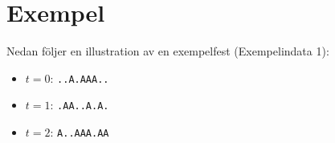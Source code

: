 \section*{Exempel}
Nedan följer en illustration av en exempelfest (Exempelindata 1):

\begin{itemize}
\item $t=0$: \texttt{..A.AAA..}
\item $t=1$: \texttt{.AA..A.A.}
\item $t=2$: \texttt{A..AAA.AA}
\end{itemize}

